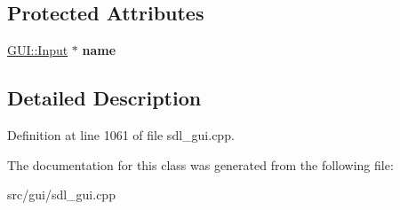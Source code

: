 \subsection*{Protected Attributes}
\begin{DoxyCompactItemize}
\item 
\hypertarget{classSetVsyncrate_a7c739c3ee8c8f232c6f753c531f88c59}{\hyperlink{classGUI_1_1Input}{G\-U\-I\-::\-Input} $\ast$ {\bfseries name}}\label{classSetVsyncrate_a7c739c3ee8c8f232c6f753c531f88c59}

\end{DoxyCompactItemize}


\subsection{Detailed Description}


Definition at line 1061 of file sdl\-\_\-gui.\-cpp.



The documentation for this class was generated from the following file\-:\begin{DoxyCompactItemize}
\item 
src/gui/sdl\-\_\-gui.\-cpp\end{DoxyCompactItemize}
